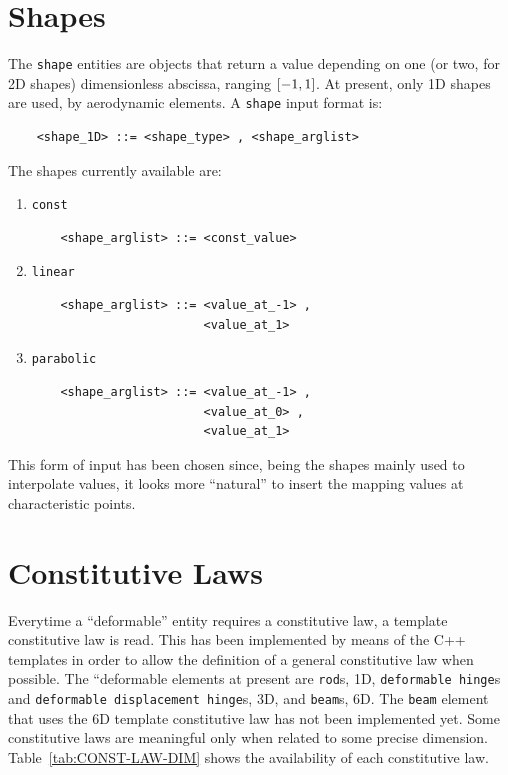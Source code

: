 \documentclass[10pt,dvips]{report}
\begin{document}
\section{Shapes}
The {\tt shape} entities are objects that return a value depending on one
(or two, for 2D shapes) dimensionless abscissa, ranging $ \left[ -1,1 \right] $.
At present, only 1D shapes are used, by aerodynamic elements.
A {\tt shape} input format is:
\begin{verbatim}
    <shape_1D> ::= <shape_type> , <shape_arglist>
\end{verbatim}
The shapes currently available are:
\begin{enumerate}
    \item {\tt const}
    \begin{verbatim}
    <shape_arglist> ::= <const_value>
    \end{verbatim}
    \item {\tt linear}
    \begin{verbatim}
    <shape_arglist> ::= <value_at_-1> , 
                        <value_at_1>
    \end{verbatim}
    \item {\tt parabolic}
    \begin{verbatim}
    <shape_arglist> ::= <value_at_-1> , 
                        <value_at_0> , 
                        <value_at_1>
    \end{verbatim}
\end{enumerate}
This form of input has been chosen since, being the shapes mainly used to
interpolate values, it looks more ``natural'' to insert the mapping values
at characteristic points.

\section{Constitutive Laws}
Everytime a ``deformable'' entity requires a constitutive law, a template
constitutive law is read. This has been implemented by means of the C++
templates in order to allow the definition of a general constitutive law
when possible. The ``deformable elements at present are {\tt rod}s, 1D,
{\tt deformable hinge}s and {\tt deformable displacement hinge}s, 3D,  
and {\tt beam}s, 6D.
The {\tt beam} element that uses the 6D template constitutive law has not been
implemented yet.
Some constitutive laws are meaningful only when related to some precise
dimension. 
Table~\ref{tab:CONST-LAW-DIM} shows the availability of each constitutive law.
\end{document}

